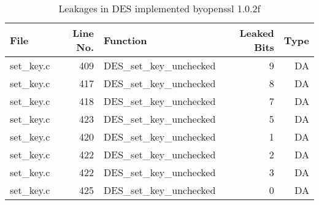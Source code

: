 \begin{table}%
\centering\tiny\scriptsize
\renewcommand{\baselinestretch}{0.96}\selectfont
\caption{Leakages in DES implemented byopenssl 1.0.2f}\label{tab:DESopenssl1.0.2f}
\begin{tabular}{lrlrr}
\hline
\textbf{File} & \textbf{Line No.} & \textbf{Function} & \textbf{Leaked Bits} & \textbf{Type} \\\hline
set\_key.c& 409&DES\_set\_key\_unchecked&9 &DA\\
set\_key.c& 417&DES\_set\_key\_unchecked&8 &DA\\
set\_key.c& 418&DES\_set\_key\_unchecked&7 &DA\\
set\_key.c& 423&DES\_set\_key\_unchecked&5 &DA\\
set\_key.c& 420&DES\_set\_key\_unchecked&1 &DA\\
set\_key.c& 422&DES\_set\_key\_unchecked&2 &DA\\
set\_key.c& 422&DES\_set\_key\_unchecked&3 &DA\\
set\_key.c& 425&DES\_set\_key\_unchecked&0 &DA\\
\hline
\end{tabular}
\renewcommand{\baselinestretch}{1.0}\selectfont
\end{table}
